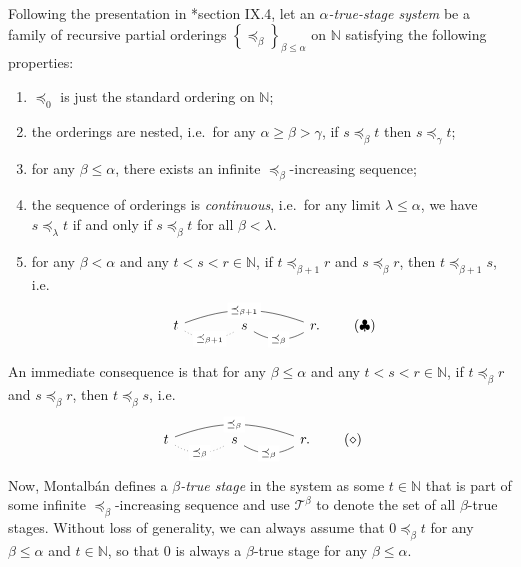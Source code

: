 \documentclass[11pt]{article}
\theoremstyle{plain}
\theoremstyle{definition}
\begin{document}
Following the presentation in \cite{montalban26-computable-structure}*{section IX.4}, let an \emph{$\alpha$-true-stage system} be a family of recursive partial orderings $\left\{\preceq_\beta\right\}_{\beta \leq \alpha}$ on $\mathbb{N}$ satisfying the following properties:
\begin{enumerate}[label=(\roman*)]
  \item $\preceq_0$ is just the standard ordering on $\mathbb{N}$;
  \item the orderings are nested, i.e.\ for any $\alpha \geq \beta > \gamma$, if $s \preceq_\beta t$ then $s \preceq_\gamma t$;
  \item for any $\beta \leq \alpha$, there exists an infinite $\preceq_\beta$-increasing sequence;
  \item the sequence of orderings is \emph{continuous}, i.e.\ for any limit $\lambda \leq \alpha$, we have $s \preceq_\lambda t$ if and only if $s \preceq_\beta t$ for all $\beta < \lambda$.
  \item for any $\beta < \alpha$ and any $t < s < r \in \mathbb{N}$, if $t \preceq_{\beta + 1} r$ and $s \preceq_\beta r$, then $t \preceq_{\beta + 1} s$, i.e.
        \[\label{eqn:ts-succ-red}
          \begin{tikzcd}[column sep=large]
            t \arrow[r, dotted, no head, bend right, "\preceq_{\beta + 1}" description] \arrow[rr, no head, bend left=20, "\preceq_{\beta + 1}" description] & s \arrow[r, no head, bend right, "\preceq_\beta" description] & r.
          \end{tikzcd}
          \tag{$\clubsuit$}\]
\end{enumerate}

An immediate consequence is that for any $\beta \leq \alpha$ and any $t < s < r \in \mathbb{N}$, if $t \preceq_\beta r$ and $s \preceq_\beta r$, then $t \preceq_\beta s$, i.e.
\[\label{eqn:ts-level-red}
  \begin{tikzcd}[column sep=large]
    t \arrow[r, dotted, no head, bend right, "\preceq_\beta" description] \arrow[rr, no head, bend left=20, "\preceq_\beta" description] & s \arrow[r, no head, bend right, "\preceq_\beta" description] & r.
  \end{tikzcd}
  \tag{$\diamond$}\]

Now, Montalb\'an defines a \emph{$\beta$-true stage} in the system as some $t \in \mathbb{N}$ that is part of some infinite $\preceq_\beta$-increasing sequence and use $\mathcal{T}^\beta$ to denote the set of all $\beta$-true stages. Without loss of generality, we can always assume that $0 \preceq_\beta t$ for any $\beta \leq \alpha$ and $t \in \mathbb{N}$, so that $0$ is always a $\beta$-true stage for any $\beta \leq \alpha$.
\end{document}
